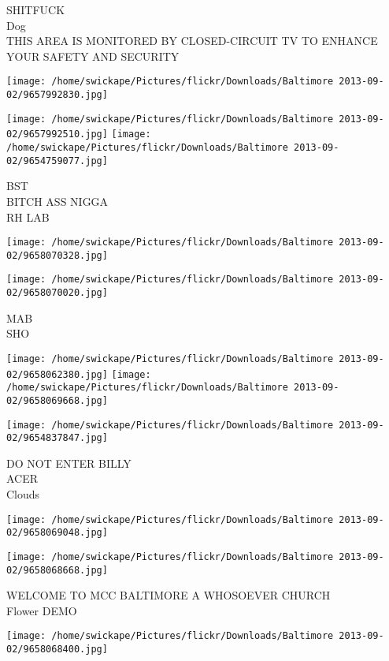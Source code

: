 \documentclass[10pt,letterpaper]{article}
\begin{document}
SHITFUCK\\
Dog\\
THIS AREA IS MONITORED BY CLOSED{-}CIRCUIT TV TO ENHANCE YOUR SAFETY AND SECURITY
\pagebreak

\texttt{[image: /home/swickape/Pictures/flickr/Downloads/Baltimore 2013-09-02/9657992830.jpg]}

\vspace{0.25in}
\texttt{[image: /home/swickape/Pictures/flickr/Downloads/Baltimore 2013-09-02/9657992510.jpg]}
\texttt{[image: /home/swickape/Pictures/flickr/Downloads/Baltimore 2013-09-02/9654759077.jpg]}

BST\\
BITCH ASS NIGGA\\
RH LAB
\pagebreak

\texttt{[image: /home/swickape/Pictures/flickr/Downloads/Baltimore 2013-09-02/9658070328.jpg]}

\vspace{0.25in}
\texttt{[image: /home/swickape/Pictures/flickr/Downloads/Baltimore 2013-09-02/9658070020.jpg]}

MAB\\
SHO
\pagebreak

\texttt{[image: /home/swickape/Pictures/flickr/Downloads/Baltimore 2013-09-02/9658062380.jpg]}
\texttt{[image: /home/swickape/Pictures/flickr/Downloads/Baltimore 2013-09-02/9658069668.jpg]}

\vspace{0.25in}
\texttt{[image: /home/swickape/Pictures/flickr/Downloads/Baltimore 2013-09-02/9654837847.jpg]}

DO NOT ENTER BILLY\\
ACER\\
Clouds
\pagebreak

\texttt{[image: /home/swickape/Pictures/flickr/Downloads/Baltimore 2013-09-02/9658069048.jpg]}

\vspace{0.25in}
\texttt{[image: /home/swickape/Pictures/flickr/Downloads/Baltimore 2013-09-02/9658068668.jpg]}

WELCOME TO MCC BALTIMORE A WHOSOEVER CHURCH\\
Flower DEMO
\pagebreak

\texttt{[image: /home/swickape/Pictures/flickr/Downloads/Baltimore 2013-09-02/9658068400.jpg]}
\end{document}
